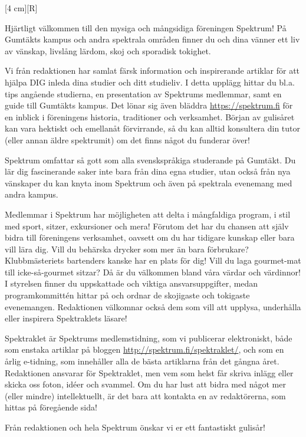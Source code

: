 \documentclass{spektraklet}
\begin{document}
\begin{ledaren}{}

[4 cm][R]

Hjärtligt välkommen till den mysiga och mångsidiga föreningen Spektrum! På Gumtäkts kampus och andra spektrala områden finner du och dina vänner ett liv av vänskap, livslång lärdom, skoj och sporadisk tokighet.

Vi från redaktionen har samlat färsk information och inspirerande artiklar för att hjälpa DIG inleda dina studier och ditt studieliv. I detta upplägg hittar du bl.a. tips angående studierna, en presentation av Spektrums medlemmar, samt en guide till Gumtäkts kampus. Det lönar sig även bläddra \url{https://spektrum.fi} för en inblick i föreningens historia, traditioner och verksamhet. Början av gulisåret kan vara hektiskt och emellanåt förvirrande, så du kan alltid konsultera din tutor (eller annan äldre spektrumit) om det finns något du funderar över!

Spektrum omfattar så gott som alla svenskspråkiga studerande på Gumtäkt. Du lär dig fascinerande saker inte bara från dina egna studier, utan också från nya vänskaper du kan knyta inom Spektrum och även på spektrala evenemang med andra kampus. 

Medlemmar i Spektrum har möjligheten att delta i mångfaldiga program, i stil med sport, sitzer, exkursioner och mera! Förutom det har du chansen att själv bidra till föreningens verksamhet, oavsett om du har tidigare kunskap eller bara vill lära dig. Vill du behärska drycker som mer än bara förbrukare? Klubbmästeriets bartenders kanske har en plats för dig! Vill du laga gourmet-mat till icke-så-gourmet sitzar? Då är du välkommen bland våra värdar och värdinnor! I styrelsen finner du uppskattade och viktiga ansvarsuppgifter, medan programkommittén hittar på och ordnar de skojigaste och tokigaste evenemangen. Redaktionen välkomnar också dem som vill att upplysa, underhålla eller inspirera Spektraklets läsare!

Spektraklet är Spektrums medlemstidning, som vi publicerar elektroniskt, både som enstaka artiklar på bloggen \url{http://spektrum.fi/spektraklet/}, och som en årlig e-tidning, som innehåller alla de bästa artiklarna från det gångna året. Redaktionen ansvarar för Spektraklet, men vem som helst får skriva inlägg eller skicka oss foton, idéer och svammel. Om du har lust att bidra med något mer (eller mindre) intellektuellt, är det bara att kontakta en av redaktörerna, som hittas på föregående sida!

Från redaktionen och hela Spektrum önskar vi er ett fantastiskt gulisår!
\end{ledaren}
\end{document}
